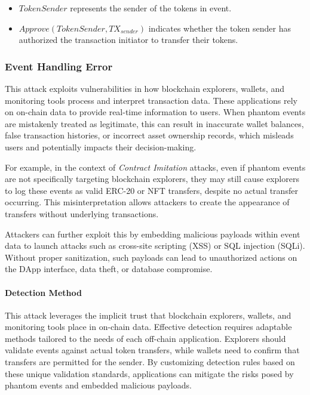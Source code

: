\begin{itemize}
    \item \( \textit{TokenSender} \) represents the sender of the tokens in event.
    \item \( Approve(\textit{TokenSender}, TX_{\textit{sender}}) \) indicates whether the token sender has authorized the transaction initiator to transfer their tokens.
\end{itemize}

\subsubsection{Event Handling Error}\label{vec:attack5}
This attack exploits vulnerabilities in how blockchain explorers, wallets, and monitoring tools process and interpret transaction data. These applications rely on on-chain data to provide real-time information to users. When phantom events are mistakenly treated as legitimate, this can result in inaccurate wallet balances, false transaction histories, or incorrect asset ownership records, which misleads users and potentially impacts their decision-making.

For example, in the context of \emph{Contract Imitation} attacks, even if phantom events are not specifically targeting blockchain explorers, they may still cause explorers to log these events as valid ERC-20 or NFT transfers, despite no actual transfer occurring. This misinterpretation allows attackers to create the appearance of transfers without underlying transactions.

Attackers can further exploit this by embedding malicious payloads within event data to launch attacks such as cross-site scripting (XSS) or SQL injection (SQLi). Without proper sanitization, such payloads can lead to unauthorized actions on the DApp interface, data theft, or database compromise.

\paragraph{Detection Method}
This attack leverages the implicit trust that blockchain explorers, wallets, and monitoring tools place in on-chain data. Effective detection requires adaptable methods tailored to the needs of each off-chain application. Explorers should validate events against actual token transfers, while wallets need to confirm that transfers are permitted for the sender. By customizing detection rules based on these unique validation standards, applications can mitigate the risks posed by phantom events and embedded malicious payloads.
